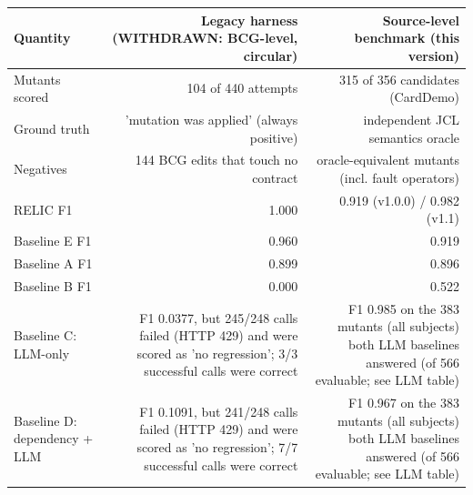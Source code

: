 \begin{tabular}{lrr}
\toprule
Quantity & Legacy harness (WITHDRAWN: BCG-level, circular) & Source-level benchmark (this version) \\
\midrule
Mutants scored & 104 of 440 attempts & 315 of 356 candidates (CardDemo) \\
Ground truth & 'mutation was applied' (always positive) & independent JCL semantics oracle \\
Negatives & 144 BCG edits that touch no contract & oracle-equivalent mutants (incl. fault operators) \\
RELIC F1 & 1.000 & 0.919 (v1.0.0) / 0.982 (v1.1) \\
Baseline E F1 & 0.960 & 0.919 \\
Baseline A F1 & 0.899 & 0.896 \\
Baseline B F1 & 0.000 & 0.522 \\
Baseline C: LLM-only & F1 0.0377, but 245/248 calls failed (HTTP 429) and were scored as 'no regression'; 3/3 successful calls were correct & F1 0.985 on the 383 mutants (all subjects) both LLM baselines answered (of 566 evaluable; see LLM table) \\
Baseline D: dependency + LLM & F1 0.1091, but 241/248 calls failed (HTTP 429) and were scored as 'no regression'; 7/7 successful calls were correct & F1 0.967 on the 383 mutants (all subjects) both LLM baselines answered (of 566 evaluable; see LLM table) \\
\bottomrule
\end{tabular}
